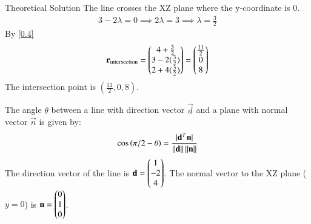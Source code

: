 \documentclass{beamer}
\begin{document}
	\begin{frame}{Theoretical Solution}
	The line crosses the XZ plane where the y-coordinate is 0.
	\begin{align}
		3 - 2\lambda = 0 \implies 2\lambda = 3 \implies \lambda = \frac{3}{2} \label{0.4}
	\end{align}
	By \eqref{0.4}
	\begin{align}
		\mathbf{r}_{\text{intersection}} = \begin{pmatrix}4 + \frac{3}{2} \\ 3 - 2(\frac{3}{2}) \\ 2 + 4(\frac{3}{2})\end{pmatrix} = \begin{pmatrix}\frac{11}{2} \\ 0 \\ 8\end{pmatrix}
	\end{align}
	The intersection point is $(\frac{11}{2}, 0, 8)$.
	
	The angle $\theta$ between a line with direction vector $\vec{d}$ and a plane with normal vector $\vec{n}$ is given by:
	\begin{align}
		\cos\left(\pi/2-\theta\right)= \frac{|\mathbf{d}^T\mathbf{n}|}{\left\lVert\mathbf{d}\right\rVert \left\lVert\mathbf{n}\right\rVert} \label{0.6}
	\end{align}
	The direction vector of the line is $\mathbf{d} = \begin{pmatrix}1 \\ -2 \\ 4\end{pmatrix}$. The normal vector to the XZ plane ($y=0$) is $\mathbf{n} = \begin{pmatrix}0 \\ 1 \\ 0\end{pmatrix}$.
	\end{frame}
\end{document}
